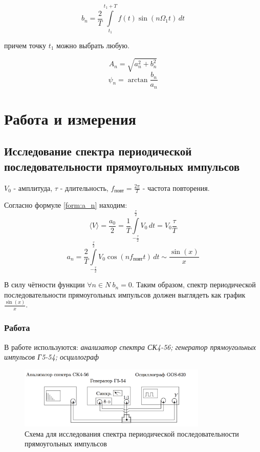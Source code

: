 \documentclass[a4paper, 12pt]{article}
\begin{document}
\begin{equation}
	b_{n} = \frac{2}{T}\int\limits_{t_{1}}^{t_{1}+T}f(t)\sin(n\Omega_{1}t)\, dt 
\label{form:b_n}
\end{equation}

причем точку $t_{1}$ можно выбрать любую.

\begin{equation}
\label{form:A_n}
	A_{n} = \sqrt{a_{n}^2+b_{n}^2}
\end{equation}
\begin{equation}
	\psi_{n} = \arctan\frac{b_{n}}{a_{n}}
\label{form:psi_n}
\end{equation}
\section{Работа и измерения}
\subsection*{Исследование спектра периодической последовательности прямоугольных импульсов}

$V_0$  - амплитуда, $\tau$ - длительность, $f_\text{повт} = \frac{2\pi}{T} $ - частота повторения.

Согласно формуле \ref{form:a_n} находим:
$$ \langle V \rangle = \frac{a_0}{2} =  \frac{1}{T}\int\limits_{ -\frac{\tau}{2} } ^ {\frac{\tau}{2} } V_0\,dt = V_0 \frac{\tau}{T}
$$
\begin{equation}
\label{form:app_a_n}
	a_n = \frac{2}{T}\int\limits_{ -\frac{\tau}{2} } ^ {\frac{\tau}{2} } V_0\cos(nf_\text{повт}t)\, dt \sim \frac{\sin(x)}{x}
\end{equation}
 
В силу чётности функции $\forall n \in {N} \ b_n=0$. Таким образом, спектр периодической последовательности прямоугольных импульсов должен выглядеть как график $\frac{\sin(x)}{x}$.
\subsubsection*{Работа}
В работе используются: \textit{анализатор спектра СК4-56; генератор прямоугольных импульсов Г5-54; осциллограф}



\begin{figure}[H]
\centering
\includegraphics[width = 0.8\textwidth]{SchemeA}
\caption{Схема для исследования спектра периодической последовательности прямоугольных импульсов}
\label{img:scheme A}
\end{figure}
\end{document}
